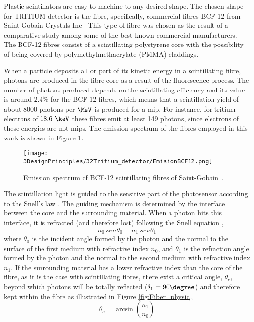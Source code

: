 Plastic scintillators are easy to machine to any desired shape. The chosen shape for TRITIUM detector is the fibre, specifically, commercial fibres BCF-12 from Saint-Gobain Crystals Inc \cite{DataSheetBCF12Fiber}. This type of fibre was chosen as the result of a comparative study \cite{TFGAlberto} among some of the best-known commercial manufacturers. The BCF-12 fibres consist of a scintillating polystyrene core with the possibility of being covered by polymethylmethacrylate (PMMA) claddings. %

When a particle deposits all or part of its kinetic energy in a scintillating fibre, photons are produced in the fibre core as a result of the fluorescence process. The number of photons produced depends on the scintillating efficiency and its value is around $2.4\%$ for the BCF-12 fibres, which means that a scintillation yield of about $8000$ photons per $\MeV$ is produced for a mip. For instance, for tritium electrons of $18.6~\keV$ these fibres emit at least 149 photons, since electrons of these energies are not mips. The emission spectrum of the fibres employed in this work is shown in Figure \ref{fig:EmissionSpectrumFibers}.

\begin{figure}[htbp]
\centering
\texttt{[image: 3DesignPrinciples/32Tritium\_detector/EmisionBCF12.png]}
\caption{Emission spectrum of BCF-12 scintillating fibres of Saint-Gobain\label{fig:EmissionSpectrumFibers}~\cite{DataSheetBCF12Fiber}.}
\end{figure}

The scintillation light is guided to the sensitive part of the photosensor according to the Snell's law \cite{Snell}. The guiding mechanism is determined by the interface between the core and the surrounding material. When a photon hits this interface, it is refracted (and therefore lost) following the Snell equation \cite{Snell}, 
\begin{equation}
n_0~sen\theta_0 = n_1~sen\theta_1
\label{eq:Snell}
\end{equation}
where $\theta_0$ is the incident angle formed by the photon and the normal to the surface of the first medium with refractive index $n_0$, and $\theta_1$  is the refraction angle formed by the photon and the normal to the second medium with refractive index $n_1$. If the surrounding material has a lower refractive index than the core of the fibre, as it is the case with scintillating fibres, there exist a critical angle, $\theta_c$, beyond which photons will be totally reflected ($\theta_1 = 90\degree$) and therefore kept within the fibre as illustrated in Figure \ref{fig:Fiber_physic},
\begin{equation}
\theta_c = \arcsin\left(\frac{n_1}{n_0} \right)
\label{eq:CriticAngle}
\end{equation}

